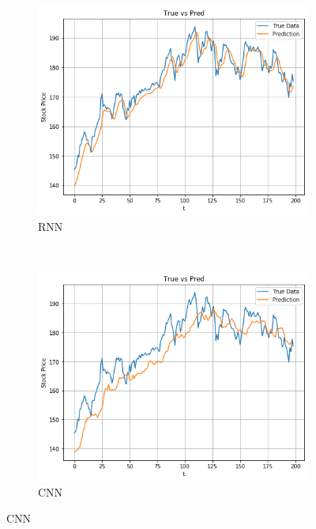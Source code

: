 \documentclass[11pt]{article}
\begin{document}
\begin{figure}
    \centering
    \begin{subfigure}[b]{0.3\textwidth}
        \includegraphics[width=\textwidth]{media/result-rnn}
        \caption{RNN}
        \label{fig:result-rnn}
    \end{subfigure}
    ~ %
    \begin{subfigure}[b]{0.3\textwidth}
        \includegraphics[width=\textwidth]{media/result-cnn}
        \caption{CNN}
        \label{fig:result-cnn}
    \end{subfigure}

\end{figure}
\end{document}
